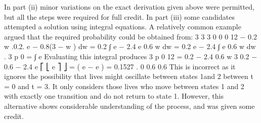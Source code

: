 \documentclass[a4paper,12pt]{article}
\begin{document}


In part (ii) minor variations on the exact derivation given above were permitted, but all the
steps were required for full credit. In part (iii) some candidates attempted a solution using
integral equations. A relatively common example argued that the required probability could
be obtained from:
3 3 3
0 0 0
12
− 0.2 w
.0.2. e − 0.8(3 − w ) dw = 0.2 ∫ e − 2.4 e 0.6 w dw = 0.2 e − 2.4 ∫ e 0.6 w dw .
3 p 0 = ∫ e
Evaluating this integral produces 3 p 0 12 =
0.2 − 2.4 0.6 w 3 0.2 − 0.6 − 2.4
e ⎡ ⎣ e ⎤ ⎦ =
( e − e ) = 0.1527 .
0
0.6
0.6
This is incorrect as it ignores the possibility that lives might oscillate between states 1and 2
between t = 0 and t = 3. It only considers those lives who move between states 1 and 2 with
exactly one transition and do not return to state 1. However, this alternative shows
considerable understanding of the process, and was given some credit.
\end{document}
